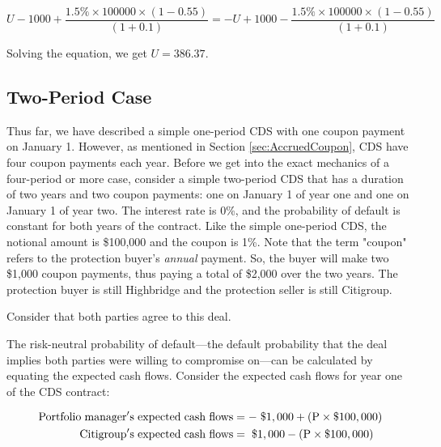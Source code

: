 \documentclass{jss}
\begin{document}
$$U - 1000 + \frac{1.5\% \times 100000\times (1 - 0.55)}{(1 + 0.1)} = - U + 1000 - \frac{1.5\%\times100000\times(1 - 0.55)}{(1 + 0.1)}$$

Solving the equation, we get $U = 386.37$. \\

\subsection{Two-Period Case}


Thus far, we have described a simple one-period CDS with one coupon payment on January 1. However, as mentioned in Section \ref{sec:AccruedCoupon}, CDS have four coupon payments each year. Before we get into the exact mechanics of a four-period or more case, consider a simple two-period CDS that has a duration of two years and 
two coupon payments: one on January 1 of year one and one on January 1 of year two. The interest rate is 0\%, and the probability of default is constant for both years of the contract. Like the simple one-period CDS, the notional amount is \$100,000 and the coupon is 1\%. Note that the term "coupon" refers to the protection buyer's \emph{annual} payment. So, the buyer will make two \$1,000 coupon payments, thus paying a total of \$2,000 over the two years. The protection buyer is still Highbridge and the protection seller is still Citigroup. 

Consider that both parties agree to this deal. 

The risk-neutral probability of default---the default probability that the deal implies both parties were willing to compromise on---can be calculated by equating the expected cash flows. Consider the expected cash flows for year one of the CDS contract:

\begin{align}
  \rm Portfolio\hspace{3pt}manager's\hspace{3pt}expected\hspace{3pt}cash\hspace{3pt}flows &= \rm -\hspace{3pt}\$1,000 + (P \times {\$100,000}) \\
  \rm Citigroup's\hspace{3pt}expected\hspace{3pt}cash\hspace{3pt}flows &= \rm \hspace{3pt}\$1,000 - (P \times {\$100,000})
\end{align}
\end{document}
